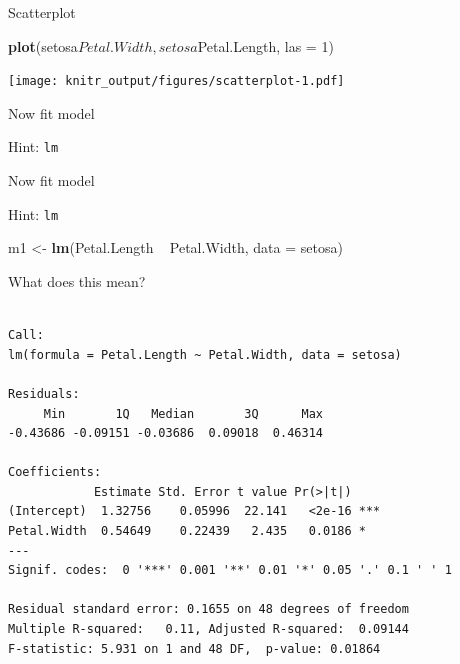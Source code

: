 \documentclass[10pt,ignorenonframetext,]{beamer}
\newenvironment{Shaded}{\begin{snugshade}}{\end{snugshade}}
\newcommand{\KeywordTok}[1]{\textcolor[rgb]{0.13,0.29,0.53}{\textbf{{#1}}}}
\newcommand{\DataTypeTok}[1]{\textcolor[rgb]{0.13,0.29,0.53}{{#1}}}
\newcommand{\DecValTok}[1]{\textcolor[rgb]{0.00,0.00,0.81}{{#1}}}
\newcommand{\StringTok}[1]{\textcolor[rgb]{0.31,0.60,0.02}{{#1}}}
\newcommand{\NormalTok}[1]{{#1}}
\begin{document}
\begin{frame}[fragile]{Scatterplot}

\begin{Shaded}
\begin{Highlighting}[]
\KeywordTok{plot}\NormalTok{(setosa$Petal.Width, setosa$Petal.Length, }\DataTypeTok{las =} \DecValTok{1}\NormalTok{)}
\end{Highlighting}
\end{Shaded}

\texttt{[image: knitr\_output/figures/scatterplot-1.pdf]}

\end{frame}

\begin{frame}[fragile]{Now fit model}

Hint: \texttt{lm}

\end{frame}

\begin{frame}[fragile]{Now fit model}

Hint: \texttt{lm}

\begin{Shaded}
\begin{Highlighting}[]
\NormalTok{m1 <-}\StringTok{ }\KeywordTok{lm}\NormalTok{(Petal.Length ~}\StringTok{ }\NormalTok{Petal.Width, }\DataTypeTok{data =} \NormalTok{setosa)}
\end{Highlighting}
\end{Shaded}

\end{frame}

\begin{frame}[fragile]{What does this mean?}

\begin{verbatim}

Call:
lm(formula = Petal.Length ~ Petal.Width, data = setosa)

Residuals:
     Min       1Q   Median       3Q      Max 
-0.43686 -0.09151 -0.03686  0.09018  0.46314 

Coefficients:
            Estimate Std. Error t value Pr(>|t|)    
(Intercept)  1.32756    0.05996  22.141   <2e-16 ***
Petal.Width  0.54649    0.22439   2.435   0.0186 *  
---
Signif. codes:  0 '***' 0.001 '**' 0.01 '*' 0.05 '.' 0.1 ' ' 1

Residual standard error: 0.1655 on 48 degrees of freedom
Multiple R-squared:   0.11, Adjusted R-squared:  0.09144 
F-statistic: 5.931 on 1 and 48 DF,  p-value: 0.01864
\end{verbatim}

\end{frame}
\end{document}
